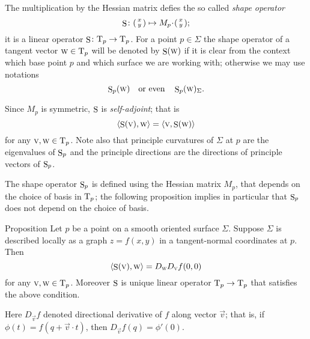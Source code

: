 The multiplication by the Hessian matrix defies the so called \emph{shape operator}
\[\Shape\:(\begin{smallmatrix}
x\\y
\end{smallmatrix})
\mapsto
M_p\cdot(\begin{smallmatrix}
x\\y
\end{smallmatrix});\]
it is a linear operator $\mathop{\rm S}\nolimits\colon\mathrm{T}_p\to \mathrm{T}_p$.
For a point $p\in \Sigma$ the shape operator of a tangent vector $\textsc w\in \mathrm{T}_p$ will be denoted by $\mathop{\rm S}\nolimits(\textsc w)$ if it is clear from the context which base point $p$ and which surface we are working with;
otherwise we may use notations 
\[\mathop{\rm S}\nolimits_p(\textsc w)\quad\text{or even}\quad \mathop{\rm S}\nolimits_p(\textsc w)_\Sigma.\]


Since $M_p$ is symmetric, $\mathop{\rm S}\nolimits$ is \emph{self-adjoint}; that is
\[\langle \mathop{\rm S}\nolimits(\textsc v),\textsc w\rangle=\langle \textsc v,\mathop{\rm S}\nolimits(\textsc w)\rangle\]
for any $\textsc v,\textsc w\in\mathrm{T}_p$.
Note also that principle curvatures of $\Sigma$ at $p$ are the eigenvalues of $\mathop{\rm S}\nolimits_p$ and the principle directions are the directions of principle vectors of $\mathop{\rm S}\nolimits_p$.

The shape operator $\mathop{\rm S}\nolimits_p$ is defined using the Hessian matrix $M_p$, that depends on the choice of basis in $\mathrm{T}_p$;
the following proposition implies in particular that $\mathop{\rm S}\nolimits_p$ does not depend on the choice of basis. 

\begin{thm}{Proposition}\label{prop:shape=D2}
Let $p$ be a point on a smooth oriented surface $\Sigma$.
Suppose $\Sigma$ is described locally as a graph $z=f(x,y)$ in a tangent-normal coordinates at $p$.
Then
\[\langle \mathop{\rm S}\nolimits(\textsc v),\textsc w\rangle=D_{\textsc w}D_{\textsc v}f(0,0)\]
for any $\textsc v,\textsc w\in\mathrm{T}_p$.
Moreover $\mathop{\rm S}\nolimits$ is unique linear operator $\mathrm{T}_p\to\mathrm{T}_p$ that satisfies the above condition.
\end{thm}

Here $D_{\vec v}f$ denoted directional derivative of $f$ along vector $\vec v$;
that is, if $\phi(t)=f(q+\vec v\cdot t)$, then $D_{\vec v}f(q)=\phi'(0)$.

